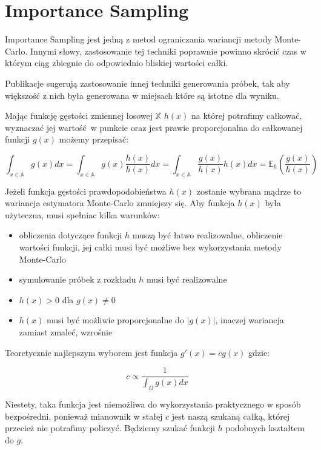\documentclass[../main.tex]{subfiles}
\begin{document}
\section{Importance Sampling}

Importance Sampling jest jedną z metod ograniczania wariancji metody
Monte-Carlo. Innymi słowy, zastosowanie tej techniki poprawnie powinno
skrócić czas w którym ciąg zbiegnie do odpowiednio bliskiej wartości całki.

Publikacje \cite{Veach}\cite{MonteCarloAnderson} sugerują zastosowanie innej
techniki generowania próbek, tak aby większość z nich była generowana w
miejsach które są istotne dla wyniku.

Mając funkcję gęstości zmiennej losowej $\mathbb{X}$ $h(x)$ na której potrafimy
całkować, wyznaczać jej wartość w punkcie oraz jest prawie proporcjonalna do
całkowanej funkcji $g(x)$ możemy przepisać:

\[
  \int_{x \in \mathbb{A}} { g(x) dx } =
  \int_{x \in \mathbb{A}} { g(x) \frac{h(x)}{h(x)} dx } =
  \int_{x \in \mathbb{A}} { \frac{g(x)}{h(x)} h(x) dx } =
  \mathbb{E}_{h}\left({ \frac{g(x)}{h(x)} }\right)
\]

Jeżeli funkcja gęstości prawdopodobieństwa $h(x)$ zostanie wybrana mądrze to
wariancja estymatora Monte-Carlo zmniejszy się. Aby funkcja $h(x)$ była
użyteczna, musi spełniac kilka warunków:

\begin{itemize}

  \item obliczenia dotyczące funkcji $h$ muszą być łatwo realizowalne,
    obliczenie wartości funkcji, jej całki musi być możliwe bez wykorzystania
    metody Monte-Carlo

  \item symulowanie próbek z rozkładu $h$ musi być realizowalne

  \item $h(x) > 0$ dla $g(x) \neq 0$

  \item $h(x)$ musi być możliwie proporcjonalne do $|g(x)|$, inaczej wariancja
    zamiast zmaleć, wzrośnie

\end{itemize}

Teoretycznie najlepszym wyborem jest funkcja $g'(x) = cg(x)$ gdzie:

\[
c \propto \frac{1}{\int_{\Omega}{g(x)dx}}
\]

\noindent Niestety, taka funkcja jest niemożliwa do wykorzystania praktycznego
w sposób bezpośredni, ponieważ mianownik w stałej $c$ jest naszą szukaną całką,
której przecież nie potrafimy policzyć. Będziemy szukać funkcji $h$ podobnych
kształtem do $g$.
\end{document}
